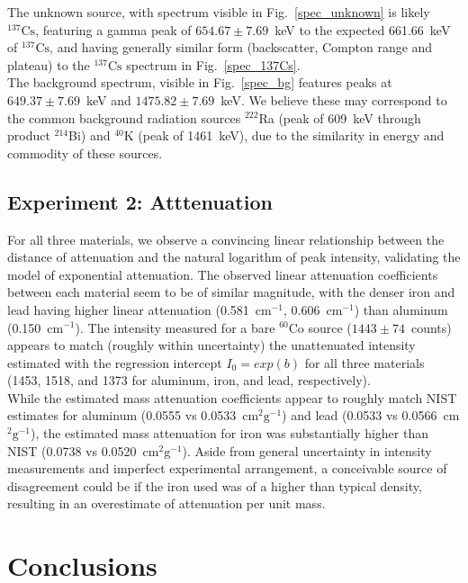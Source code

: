 \documentclass[12pt]{article}
\newcommand{\figref}[1]{Fig.~\ref{#1}}
\newcommand{\CsSrc}{\xspace$\mathrm{^{137}Cs}$\xspace}
\newcommand{\CoSrc}{\xspace$\mathrm{^{60}Co}$\xspace}
\begin{document}
The unknown source, with spectrum visible in \figref{spec_unknown} is likely \CsSrc, featuring a gamma peak of  $654.67\pm7.69$~keV to the expected 661.66~keV of \CsSrc, and having generally similar form (backscatter, Compton range and plateau) to the \CsSrc spectrum in \figref{spec_137Cs}.\\

The background spectrum, visible in \figref{spec_bg} features peaks at $649.37\pm7.69$~keV and $1475.82\pm7.69$~keV.
We believe these may correspond to the common background radiation sources $^{222}$Ra (peak of 609~keV through product $^{214}$Bi) and $^{40}$K (peak of 1461~keV)\cite{phillips_primer_nodate}, due to the similarity in energy and commodity of these sources.


\subsection{Experiment 2: Atttenuation}
For all three materials, we observe a convincing linear relationship between the distance of attenuation and the natural logarithm of peak intensity, validating the model of exponential attenuation.
The observed linear attenuation coefficients between each material seem to be of similar magnitude, with the denser iron and lead having higher linear attenuation (0.581~cm$^{-1}$, 0.606~cm$^{-1}$) than aluminum (0.150~cm$^{-1}$).
The intensity measured for a bare \CoSrc source ($1443\pm74$~counts) appears to match (roughly within uncertainty) the unattenuated intensity estimated with the regression intercept $I_0=exp(b)$ for all three materials (1453, 1518, and 1373 for aluminum, iron, and lead, respectively).\\

While the estimated mass attenuation coefficients appear to roughly match NIST estimates for aluminum (0.0555 vs 0.0533~cm$\mathrm{^{2}g^{-1}}$) and lead (0.0533 vs 0.0566~cm$\mathrm{^{2}g^{-1}}$), the estimated mass attenuation for iron was substantially higher than NIST (0.0738 vs 0.0520~cm$\mathrm{^{2}g^{-1}}$).
Aside from general uncertainty in intensity measurements and imperfect experimental arrangement, a conceivable source of disagreement could be if the iron used was of a higher than typical density, resulting in an overestimate of attenuation per unit mass.
\section{Conclusions}\label{sec:conc}
\end{document}

